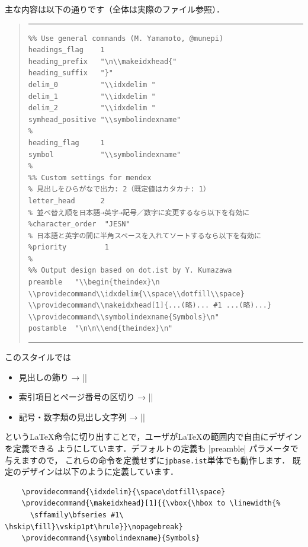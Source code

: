 \documentclass[a4paper,dvipdfmx]{jsarticle}
\newcommand{\FileName}[1]{\texttt{#1}}
\begin{document}
主な内容は以下の通りです（全体は実際のファイル参照）．
\begin{quote}
\hrule\vskip10pt\noautospacing\noautoxspacing
\begin{verbatim}
%% Use general commands (M. Yamamoto, @munepi)
headings_flag    1
heading_prefix   "\n\\makeidxhead{"
heading_suffix   "}"
delim_0          "\\idxdelim "
delim_1          "\\idxdelim "
delim_2          "\\idxdelim "
symhead_positive "\\symbolindexname"
%
heading_flag     1
symbol           "\\symbolindexname"
%
%% Custom settings for mendex
% 見出しをひらがなで出力: 2（既定値はカタカナ: 1）
letter_head      2
% 並べ替え順を日本語→英字→記号／数字に変更するなら以下を有効に
%character_order  "JESN"
% 日本語と英字の間に半角スペースを入れてソートするなら以下を有効に
%priority         1
%
%% Output design based on dot.ist by Y. Kumazawa
preamble   "\\begin{theindex}\n
\\providecommand\\idxdelim{\\space\\dotfill\\space}
\\providecommand\\makeidxhead[1]{...(略)... #1 ...(略)...}
\\providecommand\\symbolindexname{Symbols}\n"
postamble  "\n\n\\end{theindex}\n"
\end{verbatim}
\vskip10pt\hrule
\end{quote}

このスタイルでは
\begin{itemize}
 \item 見出しの飾り → |\makeidxhead|
 \item 索引項目とページ番号の区切り → |\idxdelim|
 \item 記号・数字類の見出し文字列 → |\symbolindexname|
\end{itemize}
という\LaTeX 命令に切り出すことで，ユーザが\LaTeX の範囲内で自由にデザインを定義できる
ようにしています．デフォルトの定義も |preamble| パラメータで与えますので，
これらの命令を定義せずに\FileName{jpbase.ist}単体でも動作します．
既定のデザインは以下のように定義しています．
\begin{verbatim}
    \providecommand{\idxdelim}{\space\dotfill\space}
    \providecommand{\makeidxhead}[1]{{\vbox{\hbox to \linewidth{%
      \sffamily\bfseries #1\ \hskip\fill}\vskip1pt\hrule}}\nopagebreak}
    \providecommand{\symbolindexname}{Symbols}
\end{verbatim}
\end{document}
